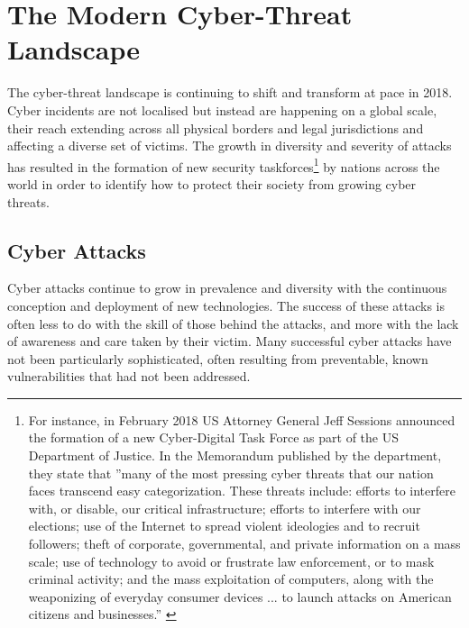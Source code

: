 \section{The Modern Cyber-Threat Landscape} \label{ModernCyberThreatLandscape}


The cyber-threat landscape is continuing to shift and transform at pace in 2018. Cyber incidents are not localised but instead are happening on a global scale, their reach extending across all physical borders and legal jurisdictions and affecting a diverse set of victims. The growth in diversity and severity of attacks has resulted in the formation of new security taskforces\footnote{For instance, in February 2018 US Attorney General Jeff Sessions announced the formation of a new Cyber-Digital Task Force as part of the US Department of Justice. In the Memorandum published by the department, they state that ''many of the most pressing cyber threats that our nation faces transcend easy categorization. These threats include: efforts to interfere with, or disable, our critical infrastructure; efforts to interfere with our elections; use of the Internet to spread violent ideologies and to recruit followers; theft of corporate, governmental, and private information on a mass scale; use of technology to avoid or frustrate law enforcement, or to mask criminal activity; and the mass exploitation of computers, along with the weaponizing of everyday consumer devices ... to launch attacks on American citizens and businesses.'' \cite{USDepartmentOfJusticeTaskForce}} by nations across the world in order to identify how to protect their society from growing cyber threats.





\subsection{Cyber Attacks}
Cyber attacks continue to grow in prevalence and diversity with the continuous conception and deployment of new technologies. The success of these attacks is often less to do with the skill of those behind the attacks, and more with the lack of awareness and care taken by their victim. Many successful cyber attacks have not been particularly sophisticated, often resulting from preventable, known vulnerabilities that had not been addressed. 



